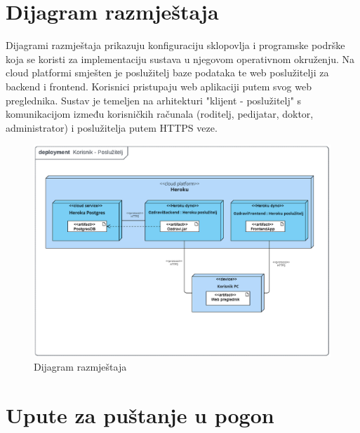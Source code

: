 		\section{Dijagram razmještaja}
			Dijagrami razmještaja prikazuju konfiguraciju sklopovlja i programske podrške koja se koristi za implementaciju sustava u njegovom operativnom okruženju. Na cloud platformi smješten je poslužitelj baze podataka te web poslužitelji za backend i frontend. Korisnici pristupaju web aplikaciji putem svog web preglednika. Sustav je temeljen na arhitekturi "klijent - poslužitelj" s komunikacijom između korisničkih računala (roditelj, pedijatar, doktor, administrator) i poslužitelja putem HTTPS veze.
			\begin{figure}[H]
				\includegraphics[width=\textwidth]{slike/deploymentDiagram.png} 
				\caption{Dijagram razmještaja} 
			\end{figure}
			\eject 
		
		\section{Upute za puštanje u pogon}
		
		
			
